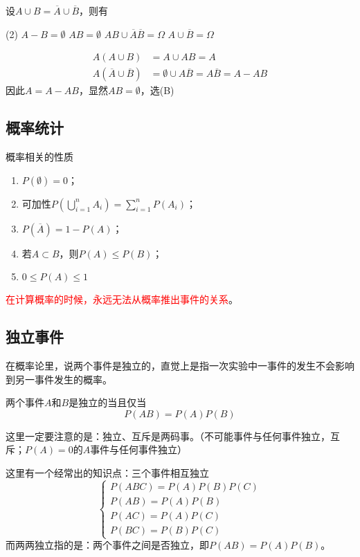 \begin{example}
    设$A\cup B = \overline{A}\cup\overline{B}$，则有
    \begin{tasks}[label=(\Alph*),label-width = 2em](2)
        \task $A-B=\emptyset$
        \task $AB=\emptyset$
        \task $AB\cup \overline{A}\overline{B}=\Omega$
        \task $A\cup \overline{B}=\Omega$
    \end{tasks}
\end{example}

\begin{solution}
    \begin{align*}
        A(A\cup B)                      & = A \cup AB = A                                       \\
        A(\overline{A}\cup\overline{B}) & = \emptyset \cup A\overline{B} = A\overline{B} = A-AB
    \end{align*}
    因此$A=A - AB$，显然$AB=\emptyset$，选(B)
\end{solution}

\subsection{概率统计}
概率相关的性质
\begin{enumerate}[(1)]
    \item $P(\emptyset) = 0$；
    \item 可加性$\displaystyle P(\bigcup_{i=1}^n A_i) = \sum_{i=1}^n P(A_i)$；
    \item $P(\overline{A}) = 1 - P(A)$；
    \item 若$A\subset B$，则$P(A)\leq P(B)$；
    \item $0\leq P(A)\leq 1$
\end{enumerate}
\textcolor{red}{在计算概率的时候，永远无法从概率推出事件的关系}。


\subsection{独立事件}
在概率论里，说两个事件是独立的，直觉上是指一次实验中一事件的发生不会影响到另一事件发生的概率。
\begin{definition}
    两个事件$A$和$B$是独立的当且仅当\[ P(AB) = P(A)P(B) \]
\end{definition}
这里一定要注意的是：独立、互斥是两码事。（不可能事件与任何事件独立，互斥；$P(A)=0$的$A$事件与任何事件独立）

这里有一个经常出的知识点：三个事件相互独立
\[
    \begin{cases}
        P(ABC)=P(A)P(B)P(C) \\
        P(AB)=P(A)P(B)      \\
        P(AC)=P(A)P(C)      \\
        P(BC)=P(B)P(C)
    \end{cases}
\]
而两两独立指的是：两个事件之间是否独立，即$P(AB)=P(A)P(B)$。

